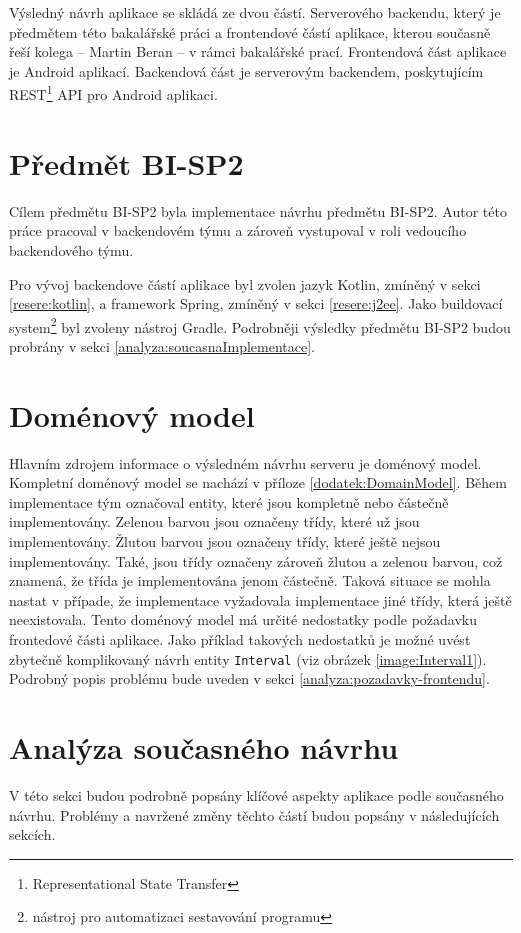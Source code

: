     Výsledný návrh aplikace se skládá ze dvou částí. Serverového backendu, který je předmětem této bakalářské práci a frontendové částí aplikace, kterou současně řeší kolega -- Martin Beran -- v rámci bakalářské prací. Frontendová část aplikace je Android aplikací. Backendová část je serverovým backendem, poskytujícím REST\footnote{Representational State Transfer} API pro Android aplikaci.

\section{Předmět BI-SP2}\label{analyza:navrh:sp2}
    Cílem předmětu BI-SP2 byla implementace návrhu předmětu BI-SP2. Autor této práce pracoval v backendovém týmu a zároveň vystupoval v roli vedoucího backendového týmu.
    
    Pro vývoj backendove částí aplikace byl zvolen jazyk Kotlin, zmíněný v sekci \ref{resere:kotlin}, a framework Spring, zmíněný v sekci \ref{resere:j2ee}. Jako {buildovací system}\footnote{nástroj pro automatizaci sestavování programu} byl zvoleny nástroj Gradle. Podrobněji výsledky předmětu BI-SP2 budou probrány v sekci \ref{analyza:soucasnaImplementace}.
        
    
\section{Doménový model}\label{analyza:navrh:DomainModel}
    Hlavním zdrojem informace o výsledném návrhu serveru je doménový model. Kompletní doménový model se nachází v příloze \ref{dodatek:DomainModel}. Během implementace tým označoval entity, které jsou kompletně nebo částečně implementovány. Zelenou barvou jsou označeny třídy, které už jsou implementovány. Žlutou barvou jsou označeny třídy, které ještě nejsou implementovány. Také, jsou třídy označeny zároveň žlutou a zelenou barvou, což znamená, že třída je implementována jenom částečně. Taková situace se mohla nastat v případe, že implementace vyžadovala implementace jiné třídy, která ještě neexistovala. Tento doménový model má určité nedostatky podle požadavku frontedové části aplikace. Jako příklad takových nedostatků je možné uvést zbytečně komplikovaný návrh entity \texttt{Interval} (viz obrázek \ref{image:Interval1}). Podrobný popis problému bude uveden v sekci \ref{analyza:pozadavky-frontendu}.

\section{Analýza současného návrhu} \label{analyza:analyza navrhu}
    V této sekci budou podrobně popsány klíčové aspekty aplikace podle současného návrhu. Problémy a navržené změny těchto částí budou popsány v následujících sekcích.


